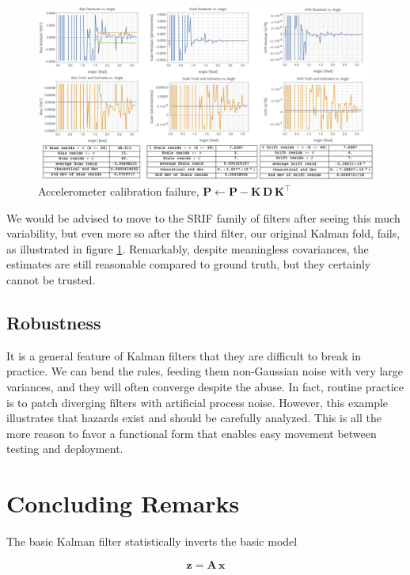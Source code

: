 \documentclass[10pt,oneside,x11names]{article}
\begin{document}
\begin{figure}[htb]
\centering
\includegraphics[width=.9\linewidth]{zarchan_musoff_3.png}
\caption{\label{fig:orgparagraph5}
Accelerometer calibration failure, \(\mathbold{P}\leftarrow\mathbold{P} -\mathbold{K}\,\mathbold{D}\,\mathbold{K}^\intercal\)}
\end{figure}

We would be advised to move to the SRIF family of filters after seeing this much
variability, but even more so after the third filter, our original Kalman fold,
fails, as illustrated in figure \ref{fig:orgparagraph5}. Remarkably, despite
meaningless covariances, the estimates are still reasonable compared to ground
truth, but they certainly cannot be trusted.

\subsection{Robustness}
\label{sec:orgheadline25}

It is a general feature of Kalman filters that they are difficult to break in
practice. We can bend the rules, feeding them non-Gaussian noise with very large
variances, and they will often converge despite the abuse. In fact, routine
practice is to patch diverging filters with artificial process noise.
However, this example illustrates that hazards exist and should be carefully
analyzed. This is all the more reason to favor a functional form that enables
easy movement between testing and deployment.

\section{Concluding Remarks}
\label{sec:orgheadline27}

The basic Kalman filter statistically inverts the basic model

\begin{equation*}
\mathbold{z} = \mathbold{A}\,\mathbold{x}
\end{equation*}
\end{document}
